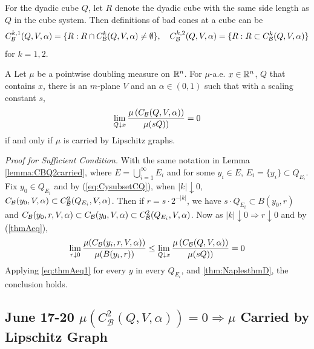 \begin{definition} For the dyadic cube $Q$, let $R$ denote the dyadic cube with the same side length as $Q$ in the cube system. Then definitions of bad cones at a cube can be 
    \begin{equation*}
        C_\mathcal B^{k,1}(Q, V, \alpha) = \{R: R\cap C_\mathcal B^k(Q, V, \alpha) \neq \emptyset\}, \quad
        C_\mathcal B^{k,2}(Q, V, \alpha) = \{R: R\subset C_\mathcal B^k(Q, V, \alpha)\} 
    \end{equation*}
for $k=1,2$.
\end{definition}




\begin{customthm}{A}\label{thmA} 
    Let $\mu$ be a pointwise doubling measure on $\mathbb{R}^n$. For $\mu$-a.e. $x \in \mathbb{R}^n$, $Q$ that contains $x$, there is an $m$-plane $V$ and an $\alpha \in(0,1)$ such that with a scaling constant $s$,
    \begin{equation}\label{thmAeq}
        \lim_{Q \downarrow x} \frac{\mu\left(C_\mathcal B(Q, V, \alpha)\right)}{\mu(sQ))}=0
    \end{equation}
    if and only if $\mu$ is carried by Lipschitz graphs.
\end{customthm}
\textit{Proof for Sufficient Condition.} With the same notation in Lemma \ref{lemma:CBQ2carried}, where $E = \bigcup_{i=1}^\infty E_i$ and for some $y_i\in E$, $E_i=\{y_i\}\subset Q_{E_i}$. Fix $y_0\in Q_{E_i}$ and by (\ref{eq:CysubsetCQ}), when $|k|\downarrow 0$, $C_\mathcal B(y_0, V, \alpha)\subset C_\mathcal B^2(Q_{E_i}, V, \alpha)$. Then if $r=s\cdot 2^{-|k|}$, we have $s\cdot Q_{E_i}\subset B(y_0, r)$ and $C_\mathcal B(y_0, r, V, \alpha)\subset C_\mathcal B(y_0, V, \alpha)\subset C_\mathcal B^2(Q_{E_i}, V, \alpha)$. Now as $|k|\downarrow 0\Rightarrow r\downarrow 0$ and by (\ref{thmAeq}),
\begin{equation}\label{eq:thmAeq1}
    \lim_{r\downarrow 0} \frac{\mu(C_\mathcal B(y_i, r, V, \alpha))}{\mu(B(y_i, r))} \leq \lim_{Q \downarrow x} \frac{\mu\left(C_\mathcal B(Q, V, \alpha)\right)}{\mu(sQ))}=0
\end{equation} 
Applying \ref{eq:thmAeq1} for every $y$ in every $Q_{E_i}$, and \ref{thm:NaplesthmD}, the conclusion holds.




\newpage
\subsection{June 17-20 \texorpdfstring{$\mu(C_\mathcal{B}^2(Q, V, \alpha)) = 0 \Rightarrow \mu$ Carried by Lipschitz Graph}{Lg}}

